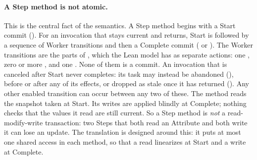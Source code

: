 \paragraph{A Step method is not atomic.}
This is the central fact of the semantics. A Step method begins with a
Start commit (). For an invocation that stays current
and returns, Start is followed by a sequence of Worker transitions and
then a Complete commit ( or
). The Worker transitions are the parts of
, which the Lean model has as separate actions: one
, zero or more , and one
. None of them is a commit. An invocation that is
canceled after Start never completes: its task may instead be abandoned
(), before or after any of its effects, or
dropped as stale once it has returned ().
Any other enabled transition can occur between any two of these. The
method
reads the snapshot taken at Start. Its writes are applied blindly at
Complete; nothing checks that the values it read are still current. So a
Step method is \emph{not} a read-modify-write transaction: two Steps that
both read an Attribute and both write it can lose an update. The
translation is designed around this: it puts at most one shared access in
each method, so that a read linearizes at Start and a write at Complete.

